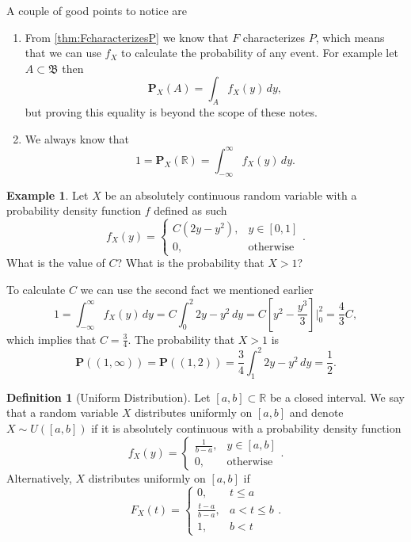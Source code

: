 \documentclass[11pt,a4paper]{article}
\theoremstyle{definition}
\newtheorem{definition}{Definition}[section]
\newtheorem{example}{Example}[section]
\theoremstyle{plain}
\newcommand{\R}{\mathbb{R}}
\newcommand{\Prob}{\mathbf{P}}
\begin{document}
  A couple of good points to notice are
  \begin{enumerate}
    \item From \autoref{thm:FcharacterizesP} we know that $F$ characterizes $P$,
    which means that we can use $f_X$ to calculate the probability of any
    event. For example let $A \subset \mathfrak B$ then
    \[
      \Prob_X(A) = \int_{A} f_X(y)\,dy,
    \]
    but proving this equality is beyond the scope of these notes.
    \item We always know that
    \[
      1 = \Prob_X(\R) = \int_{-\infty}^{\infty} f_X(y)\,dy.
    \]
  \end{enumerate}

  \begin{example}
    Let $X$ be an absolutely continuous random variable with a probability
    density function $f$ defined as such
    \[
      f_X(y) =
      \begin{cases}
        C(2y - y^2), &y \in [0,1] \\
        0, &\text{otherwise}
      \end{cases}.
    \]
    What is the value of $C$? What is the probability that $X > 1$?

    To calculate $C$ we can use the second fact we mentioned earlier
    \[
      1 =
      \int_{-\infty}^{\infty} f_X(y)\,dy =
      C \int_{0}^{2} 2y - y^2\,dy =
      C\left[y^2 - \frac{y^3}{3}\right]\biggr\vert_{0}^{2} =
      \frac{4}{3} C,
    \]
    which implies that $C = \frac{3}{4}$. The probability that $X > 1$ is
    \[
      \Prob\left((1,\infty)\right) =
      \Prob\left((1,2)\right) =
      \frac{3}{4} \int_{1}^{2} 2y - y^2\,dy =
      \frac{1}{2}.
    \]
  \end{example}

  \begin{definition}[Uniform Distribution]
    Let $[a,b] \subset \R$ be a closed interval. We say that a random 
    variable $X$ distributes uniformly on $[a,b]$ and denote $X \sim U([a,b])$
    if it is absolutely continuous with a probability density function
    \[
      f_X(y) =
      \begin{cases}
        \frac{1}{b-a}, &y \in [a,b] \\
        0, &\text{otherwise}
      \end{cases}.
    \]
    Alternatively, $X$ distributes uniformly on $[a,b]$ if
    \[
      F_X(t) =
      \begin{cases}
        0, &t \le a \\
        \frac{t-a}{b-a}, &a < t \le b \\
        1, &b < t
      \end{cases}.
    \]
  \end{definition}
\end{document}
